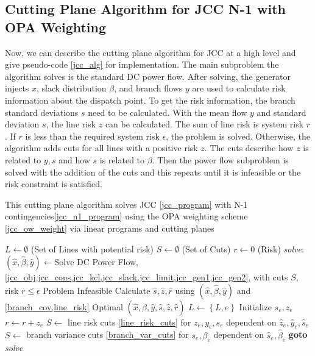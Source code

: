 \subsection{Cutting Plane Algorithm for JCC N-1 with OPA Weighting}
Now, we can describe the cutting plane algorithm for JCC at a high level and give pseudo-code \ref{jcc_alg} for implementation.  The main subproblem the algorithm solves is the standard DC power flow.  After solving, the generator injects $x$, slack distribution $\beta$, and branch flows $y$ are used to calculate risk information about the dispatch point.  To get the risk information, the branch standard deviations $s$ need to be calculated.  With the mean flow $y$ and standard deviation $s$, the line risk $z$ can be calculated.  The sum of line risk is system risk $r$.  If $r$ is less than the required system risk $\epsilon$, the problem is solved.  Otherwise, the algorithm adds cuts for all lines with a positive risk $z$.  The cuts describe how $z$ is related to $y,s$ and how $s$ is related to $\beta$.  Then the power flow subproblem is solved with the addition of the cuts and this repeats until it is infeasible or the risk constraint is satisfied.
\begin{algorithm}
\caption{This cutting plane algorithm solves JCC \ref{jcc_program} with N-1 contingencies\ref{jcc_n1_program} using the OPA weighting scheme \ref{jcc_ow_weight} via linear programs and cutting planes}\label{jcc_ow_alg}
\begin{algorithmic}
\State $L \gets \emptyset$  (Set of Lines with potential risk)
\State $S \gets \emptyset$  (Set of Cuts)
\State $r \gets 0$ (Risk)
\BState \emph{solve}:
\State $(\hat{x},\hat{\beta},\hat{y}) \gets $Solve DC Power Flow, \cref{jcc_obj,jcc_cons,jcc_kcl,jcc_slack,jcc_limit,jcc_gen1,jcc_gen2}, with cuts $S$, risk $r\leq\epsilon$
 \Return Problem Infeasible 
\EndIf
\State Calculate $\hat{s},\hat{z},\hat{r}$ using $(\hat{x},\hat{\beta},\hat{y})$ and \cref{branch_cov,line_risk}
 \Return Optimal $(\hat{x},\hat{\beta},\hat{y},\hat{s},\hat{z},\hat{r})$
\EndIf
{}
            \State $L \gets \left\{L,e\right\}$
            \State Initialize $s_e,z_e$
            \State $r \gets r + z_e$
    \EndIf            
    \State $S \gets$ line risk cuts \ref{line_risk_cuts} for $z_e,y_e,s_e$ dependent on $\hat{z}_e,\hat{y}_e,\hat{s}_e$
    \State $S \gets$ branch variance cuts \ref{branch_var_cuts} for $s_e,\beta_e$ dependent on $\hat{s}_e,\hat{\beta}_e$
\EndIf
\EndFor
\State \textbf{goto} \emph{solve}
\EndProcedure
\end{algorithmic}
\end{algorithm}



